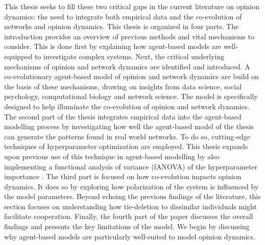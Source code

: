 \documentclass[11pt]{article}
\begin{document}
\noindent This thesis seeks to fill these two critical gaps in the current literature on opinion dynamics: the need to integrate both empirical data and the co-evolution of networks and opinion dynamics. This thesis is organized in four parts. The introduction provides an overview of previous methods and vital mechanisms to consider. This is done first by explaining how agent-based models are well-equipped to investigate complex systems. Next, the critical underlying mechanisms of opinion and network dynamics are identified and introduced. A co-evolutionary agent-based model of opinion and network dynamics are build on the basis of these mechanisms, drawing on insights from data science, social psychology, computational biology and network science. The model is specifically designed to help illuminate the co-evolution of opinion and network dynamics. 
The second part of the thesis integrates empirical data into the agent-based modelling process by investigating how well the agent-based model of the thesis can generate the patterns found in real world networks. To do so, cutting-edge techniques of hyperparameter optimization are employed. This thesis expands upon previous use of this technique in agent-based modelling by also implementing a functional analysis of variance (fANOVA) of the hyperparameter importance \cite{hutter2014efficient}. 
The third part is focused on how co-evolution impacts opinion dynamics. It does so by exploring how polarization of the system is influenced by the model parameters. Beyond echoing the previous findings of the literature, this section focuses on understanding how tie-deletion to dissimilar individuals might facilitate cooperation. 
Finally, the fourth part of the paper discusses the overall findings and presents the key limitations of the model. 
We begin by discussing why agent-based models are particularly well-suited to model opinion dynamics.
\end{document}
